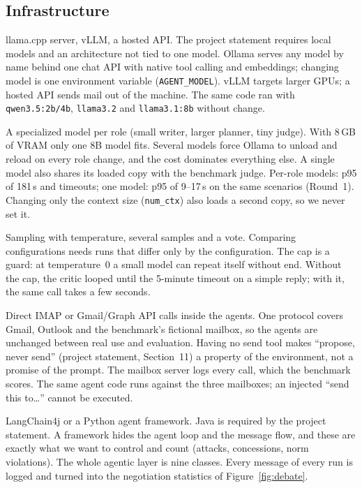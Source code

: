 \documentclass[11pt,a4paper]{article}
\newcommand{\code}[1]{\texttt{#1}}
\begin{document}
\subsection{Infrastructure}
{llama.cpp server, vLLM, a hosted API.}
{The project statement requires local models and an architecture not tied to one model. Ollama serves any model by name behind
one chat API with native tool calling and embeddings; changing model is one environment variable
(\code{AGENT\_MODEL}). vLLM targets larger GPUs; a hosted API sends mail out of the machine.}
{The same code ran with \code{qwen3.5:2b/4b}, \code{llama3.2} and \code{llama3.1:8b} without change.}

\choice{One model, \code{llama3.1:8b}, for every role.}
{A specialized model per role (small writer, larger planner, tiny judge).}
{With 8\,GB of VRAM only one 8B model fits. Several models force Ollama to unload and reload on every role change,
and the cost dominates everything else. A single model also shares its loaded copy with the benchmark judge.}
{Per-role models: p95 of 181\,s and timeouts; one model: p95 of 9--17\,s on the same scenarios (Round~1). Changing
only the context size (\code{num\_ctx}) also loads a second copy, so we never set it.}

{Sampling with temperature, several samples and a vote.}
{Comparing configurations needs runs that differ only by the configuration. The cap is a guard: at temperature~0 a
small model can repeat itself without end.}
{Without the cap, the critic looped until the 5-minute timeout on a simple reply; with it, the same call takes a few
seconds.}

{Direct IMAP or Gmail/Graph API calls inside the agents.}
{One protocol covers Gmail, Outlook and the benchmark's fictional mailbox, so the agents are unchanged between
real use and evaluation. Having no send tool makes ``propose, never send'' (project statement, Section~11) a property of the
environment, not a promise of the prompt. The mailbox server logs every call, which the benchmark scores.}
{The same agent code runs against the three mailboxes; an injected ``send this to\ldots'' cannot be executed.}

{LangChain4j or a Python agent framework.}
{Java is required by the project statement. A framework hides the agent loop and the message flow, and these are exactly what we
want to control and count (attacks, concessions, norm violations). The whole agentic layer is nine classes.}
{Every message of every run is logged and turned into the negotiation statistics of Figure~\ref{fig:debate}.}
\end{document}
